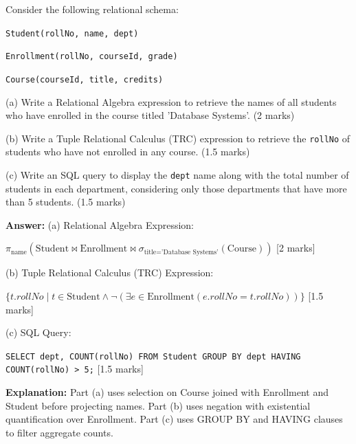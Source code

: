\begin{tcolorbox}[enhanced,breakable,colback=boxgray,colframe=gray!45,boxrule=0.4pt,arc=2pt,left=6pt,right=6pt,top=4pt,bottom=4pt,title={Q.6},fonttitle=\bfseries\small,coltitle=black,colbacktitle=gray!15]
\small Consider the following relational schema:\par
\texttt{Student(rollNo, name, dept)}\par
\texttt{Enrollment(rollNo, courseId, grade)}\par
\texttt{Course(courseId, title, credits)}\par
(a) Write a Relational Algebra expression to retrieve the names of all students who have enrolled in the course titled 'Database Systems'. (2 marks)\par
(b) Write a Tuple Relational Calculus (TRC) expression to retrieve the \texttt{rollNo} of students who have not enrolled in any course. (1.5 marks)\par
(c) Write an SQL query to display the \texttt{dept} name along with the total number of students in each department, considering only those departments that have more than 5 students. (1.5 marks)\par\par{}\par\smallskip\textbf{Answer:} (a) Relational Algebra Expression: \par
$\pi_{\text{name}} \left( \text{Student} \bowtie \text{Enrollment} \bowtie \sigma_{\text{title} = \text{'Database Systems'}}(\text{Course}) \right)$ [2 marks]\par
(b) Tuple Relational Calculus (TRC) Expression: \par
$\{ t.rollNo \mid t \in \text{Student} \land \neg(\exists e \in \text{Enrollment}(e.rollNo = t.rollNo)) \}$ [1.5 marks]\par
(c) SQL Query:\par
\texttt{SELECT dept, COUNT(rollNo) FROM Student GROUP BY dept HAVING COUNT(rollNo) \textgreater{} 5;} [1.5 marks]\par\par\textbf{Explanation:} Part (a) uses selection on Course joined with Enrollment and Student before projecting names. Part (b) uses negation with existential quantification over Enrollment. Part (c) uses GROUP BY and HAVING clauses to filter aggregate counts.\par
\end{tcolorbox}


